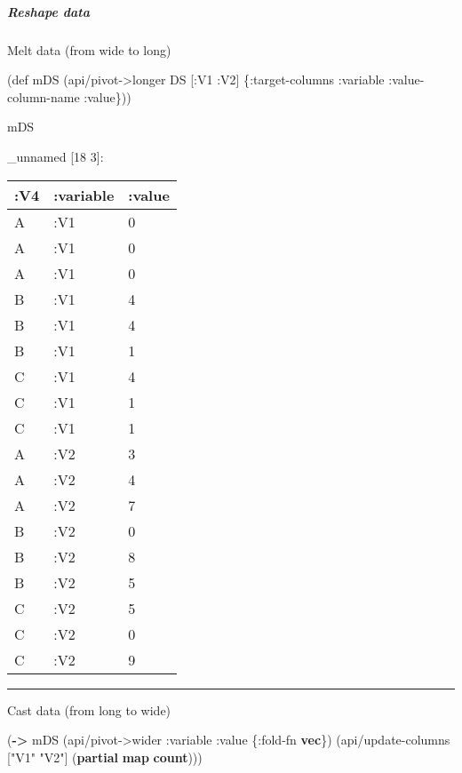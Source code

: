 \documentclass[]{article}
\newenvironment{Shaded}{\begin{snugshade}}{\end{snugshade}}
\newcommand{\AttributeTok}[1]{\textcolor[rgb]{0.77,0.63,0.00}{#1}}
\newcommand{\BuiltInTok}[1]{#1}
\newcommand{\FunctionTok}[1]{\textcolor[rgb]{0.00,0.00,0.00}{#1}}
\newcommand{\KeywordTok}[1]{\textcolor[rgb]{0.13,0.29,0.53}{\textbf{#1}}}
\newcommand{\NormalTok}[1]{#1}
\newcommand{\StringTok}[1]{\textcolor[rgb]{0.31,0.60,0.02}{#1}}
\let\oldsubparagraph\subparagraph
\renewcommand{\subparagraph}[1]{\oldsubparagraph{#1}\mbox{}}
\begin{document}
\hypertarget{reshape-data}{%
\subparagraph{Reshape data}\label{reshape-data}}

Melt data (from wide to long)

\begin{Shaded}
\begin{Highlighting}[]
\NormalTok{(}\BuiltInTok{def}\FunctionTok{ mDS }\NormalTok{(api/pivot->longer DS [}\AttributeTok{:V1} \AttributeTok{:V2}\NormalTok{] \{}\AttributeTok{:target-columns} \AttributeTok{:variable}
                                          \AttributeTok{:value-column-name} \AttributeTok{:value}\NormalTok{\}))}
\end{Highlighting}
\end{Shaded}

\begin{Shaded}
\begin{Highlighting}[]
\NormalTok{mDS}
\end{Highlighting}
\end{Shaded}

\_unnamed {[}18 3{]}:

\begin{longtable}[]{@{}lll@{}}
\toprule
:V4 & :variable & :value\tabularnewline
\midrule
\endhead
A & :V1 & 0\tabularnewline
A & :V1 & 0\tabularnewline
A & :V1 & 0\tabularnewline
B & :V1 & 4\tabularnewline
B & :V1 & 4\tabularnewline
B & :V1 & 1\tabularnewline
C & :V1 & 4\tabularnewline
C & :V1 & 1\tabularnewline
C & :V1 & 1\tabularnewline
A & :V2 & 3\tabularnewline
A & :V2 & 4\tabularnewline
A & :V2 & 7\tabularnewline
B & :V2 & 0\tabularnewline
B & :V2 & 8\tabularnewline
B & :V2 & 5\tabularnewline
C & :V2 & 5\tabularnewline
C & :V2 & 0\tabularnewline
C & :V2 & 9\tabularnewline
\bottomrule
\end{longtable}

\begin{center}\rule{0.5\linewidth}{0.5pt}\end{center}

Cast data (from long to wide)

\begin{Shaded}
\begin{Highlighting}[]
\NormalTok{(}\KeywordTok{->}\NormalTok{ mDS}
\NormalTok{    (api/pivot->wider }\AttributeTok{:variable} \AttributeTok{:value}\NormalTok{ \{}\AttributeTok{:fold-fn} \KeywordTok{vec}\NormalTok{\})}
\NormalTok{    (api/update-columns [}\StringTok{"V1"} \StringTok{"V2"}\NormalTok{] (}\KeywordTok{partial} \KeywordTok{map} \KeywordTok{count}\NormalTok{)))}
\end{Highlighting}
\end{Shaded}
\end{document}
